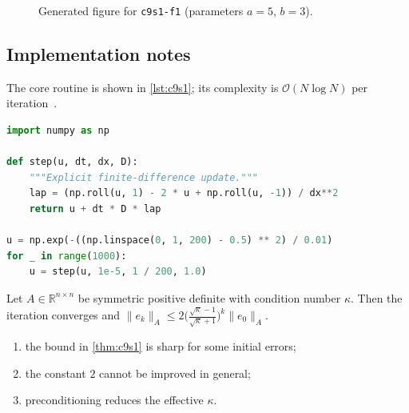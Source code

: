 \begin{figure}[htbp]
\centering
{}
\caption{Generated figure for \texttt{c9s1-f1} (parameters $a=5$, $b=3$).}\label{fig:c9s1-f1}
\end{figure}

\kant[3-11]

\subsection{Implementation notes}\label{sec:c9s1-i}
The core routine is shown in \cref{lst:c9s1}; its complexity is $\mathcal{O}(N\log N)$ per iteration~\cite{main-21}.

\begin{lstlisting}[language=python,caption={Reference implementation for c9s1.},label={lst:c9s1}]
import numpy as np

def step(u, dt, dx, D):
    """Explicit finite-difference update."""
    lap = (np.roll(u, 1) - 2 * u + np.roll(u, -1)) / dx**2
    return u + dt * D * lap

u = np.exp(-((np.linspace(0, 1, 200) - 0.5) ** 2) / 0.01)
for _ in range(1000):
    u = step(u, 1e-5, 1 / 200, 1.0)
\end{lstlisting}

\kant[9-10]
\begin{theorem}\label{thm:c9s1}
Let $A\in\mathbb{R}^{n\times n}$ be symmetric positive definite with condition number $\kappa$. Then the iteration converges and
$\lVert e_k\rVert_A \le 2\bigl(\tfrac{\sqrt\kappa-1}{\sqrt\kappa+1}\bigr)^k\lVert e_0\rVert_A$.
\end{theorem}
\begin{enumerate}[label=(\roman*)]
\item the bound in \cref{thm:c9s1} is sharp for some initial errors;
\item the constant $2$ cannot be improved in general;
\item preconditioning reduces the effective $\kappa$.
\end{enumerate}

